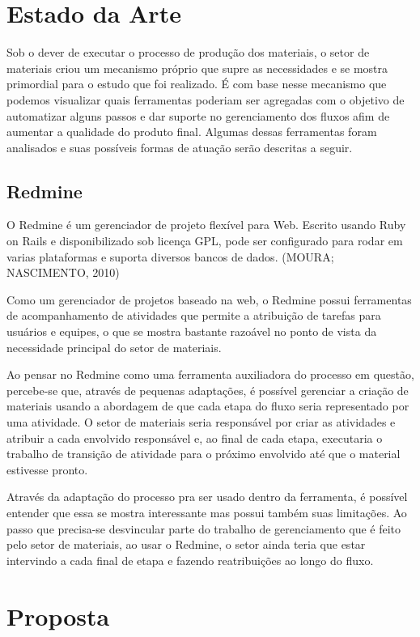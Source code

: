 \section{Estado da Arte}

Sob o dever de executar o processo de produção dos materiais, o setor de materiais criou um mecanismo próprio que supre as necessidades e se mostra primordial para o estudo que foi realizado. É com base nesse mecanismo que podemos visualizar quais ferramentas poderiam ser agregadas com o objetivo de automatizar alguns passos e dar suporte no gerenciamento dos fluxos afim de aumentar a qualidade do produto final. Algumas dessas ferramentas foram analisados e suas possíveis formas de atuação serão descritas a seguir.

\subsection{Redmine}

O Redmine é um gerenciador de projeto flexível para Web. Escrito usando Ruby on Rails e disponibilizado sob licença GPL, pode ser configurado para rodar em varias plataformas e suporta diversos bancos de dados. (MOURA; NASCIMENTO, 2010)

Como um gerenciador de projetos baseado na web, o Redmine possui ferramentas de acompanhamento de atividades que permite a atribuição de tarefas para usuários e equipes, o que se mostra bastante razoável no ponto de vista da necessidade principal do setor de materiais. 

Ao pensar no Redmine como uma ferramenta auxiliadora do processo em questão, percebe-se que, através de pequenas adaptações, é possível gerenciar a criação de materiais usando a abordagem de que cada etapa do fluxo seria representado por uma atividade. O setor de materiais seria responsável por criar as atividades e atribuir a cada envolvido responsável e, ao final de cada etapa, executaria o trabalho de transição de atividade para o próximo envolvido até que o material estivesse pronto.

Através da adaptação do processo pra ser usado dentro da ferramenta, é possível entender que essa se mostra interessante mas possui também suas limitações. Ao passo que precisa-se desvincular parte do trabalho de gerenciamento que é feito pelo setor de materiais, ao usar o Redmine, o setor ainda teria que estar intervindo a cada final de etapa e fazendo reatribuições ao longo do fluxo.

\section{Proposta}

